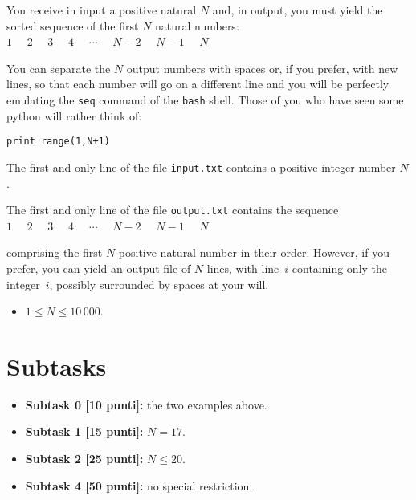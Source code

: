 \renewcommand{\nomebreve}{for1\_file}
\renewcommand{\titolo}{First exercise on {\tt for} - emulate the {\tt seq} command}

\introduzione{}

You receive in input a positive natural $N$ and,
in output, you must yield the sorted sequence of the first $N$ natural numbers:\\

  $1$  \ \ $2$  \ \ $3$  \ \ $4$  \ \ $\cdots$  \ \ $N-2$  \ \ $N-1$  \ \ $N$

You can separate the $N$ output numbers with spaces or, if you prefer,
with new lines, so that each number will go on a different line and you will be perfectly emulating the \verb'seq' command of the \verb'bash' shell.
Those of you who have seen some python will rather think of:

\verb'print range(1,N+1)'


The first and only line of the file \verb'input.txt'
contains a positive integer number $N$.

The first and only line of the file \verb'output.txt'
contains the sequence\\

  $1$  \ \ $2$  \ \ $3$  \ \ $4$  \ \ $\cdots$  \ \ $N-2$  \ \ $N-1$  \ \ $N$

comprising the first $N$ positive natural number in their order.
However, if you prefer,
you can yield an output file of $N$ lines,
with line~$i$ containing only the integer~$i$, 
possibly surrounded by spaces at your will.



\begin{itemize}[nolistsep, noitemsep]
  \item $1 \le N \le 10\,000$.
\end{itemize}
  
  \section*{Subtasks}
  \begin{itemize}
    \item \textbf{Subtask 0 [10 punti]:} the two examples above.
    \item \textbf{Subtask 1 [15 punti]:} $N = 17$.
    \item \textbf{Subtask 2 [25 punti]:} $N \leq 20$.
    \item \textbf{Subtask 4 [50 punti]:} no special restriction.
  \end{itemize}
  
